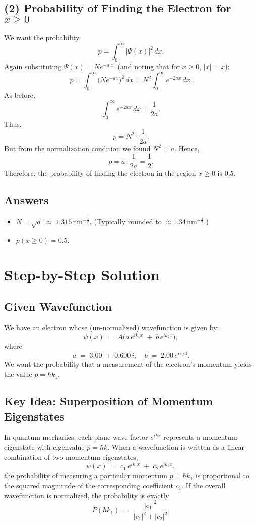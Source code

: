 \documentclass[12pt]{article}
\theoremstyle{definition} %
\theoremstyle{plain} %
\begin{document}
\subsection*{(2) Probability of Finding the Electron for \(x \ge 0\)}

\noindent
We want the probability
\[
p = \int_{0}^{\infty} \bigl|\Psi(x)\bigr|^2 \, dx.
\]
Again substituting \(\Psi(x) = N e^{-a|x|}\) (and noting that for \(x \ge 0\), \(|x|=x\)):
\[
p 
= \int_{0}^{\infty} \bigl(N e^{-ax}\bigr)^2 \, dx 
= N^2 \int_{0}^{\infty} e^{-2ax}\, dx.
\]
As before,
\[
\int_{0}^{\infty} e^{-2ax}\, dx = \frac{1}{2a}.
\]
Thus,
\[
p 
= N^2 \cdot \frac{1}{2a}.
\]
But from the normalization condition we found \(N^2 = a\). Hence,
\[
p 
= a \cdot \frac{1}{2a} 
= \frac{1}{2}.
\]
Therefore, the probability of finding the electron in the region \(x \ge 0\) is \(0.5\).

\subsection*{Answers}
\begin{itemize}
    \item \(\displaystyle N = \sqrt{a} \;\approx\; 1.316\,\mathrm{nm}^{-\tfrac12}.\)
          (Typically rounded to \(\approx 1.34\,\mathrm{nm}^{-\tfrac12}\).)
    \item \(\displaystyle p(x \ge 0) = 0.5.\)
\end{itemize}


\section*{Step-by-Step Solution}

\subsection*{Given Wavefunction}
We have an electron whose (un-normalized) wavefunction is given by:
\[
\psi(x) \;=\; A\bigl(a\,e^{i k_1 x} \;+\; b\,e^{i k_2 x}\bigr),
\]
where
\[
a \;=\; 3.00 \;+\; 0.600\,i, 
\quad
b \;=\; 2.00\,e^{i\pi/4}.
\]
We want the probability that a measurement of the electron's momentum yields the value \(p = \hbar k_1\).

\subsection*{Key Idea: Superposition of Momentum Eigenstates}
In quantum mechanics, each plane-wave factor \(e^{i k x}\) represents a momentum eigenstate with eigenvalue \(p = \hbar k\). 
When a wavefunction is written as a linear combination of two momentum eigenstates,
\[
\psi(x) \;=\; c_1\,e^{i k_1 x} \;+\; c_2\,e^{i k_2 x},
\]
the probability of measuring a particular momentum \(p = \hbar k_1\) is proportional to the squared magnitude of the corresponding coefficient \(c_1\). 
If the overall wavefunction is normalized, the probability is exactly
\[
P(\hbar k_1)
\;=\;
\frac{|c_1|^2}{|c_1|^2 + |c_2|^2}.
\]
\end{document}
